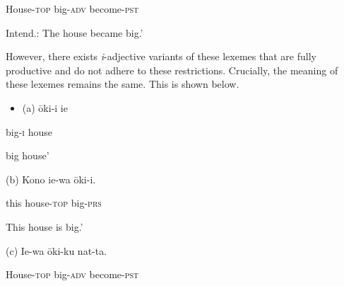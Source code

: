\documentclass[output=paper]{langscibook}
\begin{document}
\begin{styleBeispielCinqueKapitel}
House-\textsc{top} big-\textsc{adv} become-\textsc{pst}
\end{styleBeispielCinqueKapitel}

\begin{styleBeispielCinqueKapitel}
Intend.: {\textasciigrave}The house became big.’
\end{styleBeispielCinqueKapitel}

However, there exists \textit{i}{}-adjective variants of these lexemes that are fully productive and do not adhere to these restrictions. Crucially, the meaning of these lexemes remains the same. This is shown below.

\begin{itemize}
\item \begin{styleBeispielCinqueKapitel}
(a) ōki-i ie
\end{styleBeispielCinqueKapitel}
\end{itemize}
\begin{styleBeispielCinqueKapitel}
big-\textsc{i} house
\end{styleBeispielCinqueKapitel}

\begin{styleBeispielCinqueKapitel}
{\textasciigrave}big house'
\end{styleBeispielCinqueKapitel}

\begin{styleBeispielCinqueKapitel}
(b) Kono ie-wa ōki-i.
\end{styleBeispielCinqueKapitel}

\begin{styleBeispielCinqueKapitel}
this house-\textsc{top} big-\textsc{prs}
\end{styleBeispielCinqueKapitel}

\begin{styleBeispielCinqueKapitel}
{\textasciigrave}This house is big.’
\end{styleBeispielCinqueKapitel}

\begin{styleBeispielCinqueKapitel}
(c) Ie-wa ōki-ku nat-ta.
\end{styleBeispielCinqueKapitel}

\begin{styleBeispielCinqueKapitel}
House-\textsc{top} big-\textsc{adv} become-\textsc{pst}
\end{styleBeispielCinqueKapitel}
\end{document}
